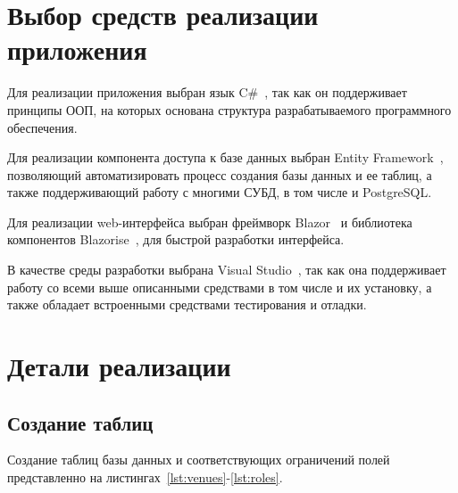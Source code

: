 \section{Выбор средств реализации приложения}

Для реализации приложения выбран язык C\#~\cite{site14}, так как он поддерживает
принципы ООП, на которых основана структура разрабатываемого программного
обеспечения. 

Для реализации компонента доступа к базе данных выбран Entity
Framework~\cite{site15}, позволяющий автоматизировать процесс создания базы
данных и ее таблиц, а также поддерживающий работу с многими СУБД, в том числе и
PostgreSQL.

Для реализации web-интерфейса выбран фреймворк Blazor~\cite{site16} и библиотека
компонентов Blazorise~\cite{site17}, для быстрой разработки интерфейса.

В качестве среды разработки выбрана Visual Studio~\cite{site18}, так как она
поддерживает работу со всеми выше описанными средствами в том числе и их
установку, а также обладает встроенными средствами тестирования и отладки.

\section{Детали реализации}

\subsection{Создание таблиц}

Создание таблиц базы данных и соответствующих ограничений полей представленно на
листингах~\ref{lst:venues}-\ref{lst:roles}.

{
\captionsetup{format=hang,justification=raggedright,
              singlelinecheck=off,width=16cm}


\clearpage



\clearpage
{}



\clearpage
{}


}

